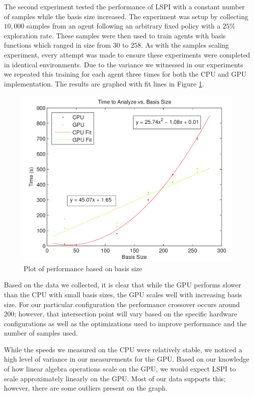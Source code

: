 The second experiment tested the performance of LSPI with a constant number of samples while the basis size increased. The experiment was setup by collecting $10,000$ samples from an agent following an arbitrary fixed policy with a $25\%$ exploration rate. These samples were then used to train agents with basis functions which ranged in size from $30$ to $258$. As with the samples scaling experiment, every attempt was made to ensure these experiments were completed in identical environments. Due to the variance we witnessed in our experiments we repeated this training for each agent three times for both the CPU and GPU implementation. The results are graphed with fit lines in Figure \ref{fig:basis}.

\begin{figure}
    \centering
    \includegraphics[height=0.33\paperheight]{Time_vs_Basis.png}
    \caption{Plot of performance based on basis size}
    \label{fig:basis}
\end{figure}

Based on the data we collected, it is clear that while the GPU performs slower than the CPU with small basis sizes, the GPU scales well with increasing basis size. For our particular configuration the performance crossover occurs around $200$; however, that intersection point will vary based on the specific hardware configurations as well as the optimizations used to improve performance and the number of samples used.

While the speeds we measured on the CPU were relatively stable, we noticed a high level of variance in our measurements for the GPU. Based on our knowledge of how linear algebra operations scale on the GPU, we would expect LSPI to scale approximately linearly on the GPU. Most of our data supports this; however, there are some outliers present on the graph.

